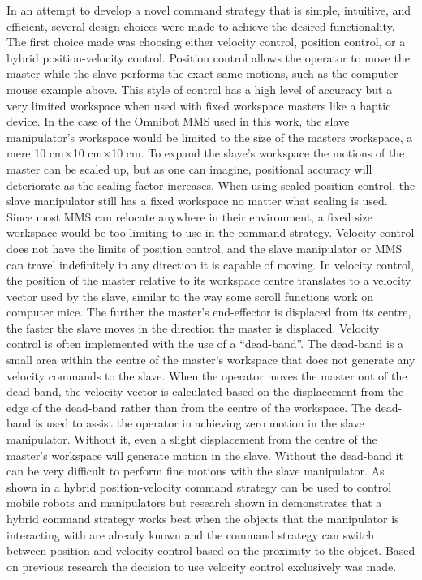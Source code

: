 \documentclass[onecolumn,10pt,final]{asme2ej}
\begin{document}
In an attempt to develop a novel command strategy that is simple, intuitive, and efficient, several design choices were made to achieve the desired functionality. The first choice made was choosing either velocity control, position control, or a hybrid position-velocity control. Position control allows the operator to move the master while the slave performs the exact same motions, such as the computer mouse example above. This style of control has a high level of accuracy but a very limited workspace when used with fixed workspace masters like a haptic device. In the case of the Omnibot MMS used in this work, the slave manipulator's workspace would be limited to the size of the masters workspace, a mere 10 cm$\times$10 cm$\times$10 cm. To expand the slave's workspace the motions of the master can be scaled up, but as one can imagine, positional accuracy will deteriorate as the scaling factor increases. When using scaled position control, the slave manipulator still has a fixed workspace no matter what scaling is used. Since most MMS can relocate anywhere in their environment, a fixed size workspace would be too limiting to use in the command strategy. Velocity control does not have the limits of position control, and the slave manipulator or MMS can travel indefinitely in any direction it is capable of moving. In velocity control, the position of the master relative to its workspace centre translates to a velocity vector used by the slave, similar to the way some scroll functions work on computer mice. The further the master's end-effector is displaced from its centre, the faster the slave moves in the direction the master is displaced. Velocity control is often implemented with the use of a ``dead-band''. The dead-band is a small area within the centre of the master's workspace that does not generate any velocity commands to the slave. When the operator moves the master out of the dead-band, the velocity vector is calculated based on the displacement from the edge of the dead-band rather than from the centre of the workspace. The dead-band is used to assist the operator in achieving zero motion in the slave manipulator. Without it, even a slight displacement from the centre of the master's workspace will generate motion in the slave. Without the dead-band it can be very difficult to perform fine motions with the slave manipulator. As shown in \cite{fark} a hybrid position-velocity command strategy can be used to control mobile robots and manipulators but research shown in \cite{w3} demonstrates that a hybrid command strategy works best when the objects that the manipulator is interacting with are already known and the command strategy can switch between position and velocity control based on the proximity to the object. Based on previous research  \cite{w1,w2,w3,w4} the decision to use velocity control exclusively was made.\\
\end{document}
